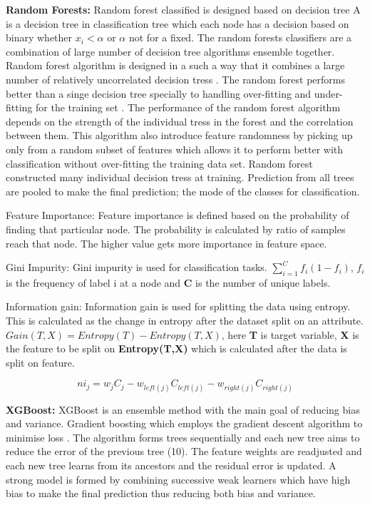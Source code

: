 \begin{outline}
 \1 \textbf{Random Forests:} Random forest classified is designed based on decision tree A is a decision tree in classification tree which each node has a  decision based on binary whether  $x_i < \alpha$ or $\alpha$  not for a fixed. The random forests classifiers are a combination of large number of decision tree  algorithms \cite{breiman2001random} ensemble together. Random forest algorithm is designed in a such a way that it combines a large number of relatively uncorrelated decision tress \cite{breiman2001random}. The random forest performs better than a singe decision tree specially to handling over-fitting and under-fitting for the training set \cite{Mishra2021}. The performance of the random forest algorithm depends on the strength of the individual tress in the forest and the correlation between them. This algorithm also introduce feature randomness by picking up only from a random subset of features which allows it to perform better with classification without over-fitting the training data set. Random forest constructed many individual decision tress at training. Prediction from all trees are pooled to make the final prediction; the mode of the classes for classification.  
 
 \2 Feature Importance: Feature importance is defined based on the probability of finding that particular node. The probability is calculated by ratio of samples reach that node. The higher value gets more importance in feature space. 
 
 \2 Gini Impurity: Gini impurity is used for classification tasks. $\sum_{i=1}^{C} f_i{(1-f_i)}$, \textbf{$f_i$} is the frequency of label i at a node and \textbf{C} is the number of unique labels. 
 
 \2 Information gain: Information gain is used for splitting the data using entropy. This is calculated as the change in entropy after the dataset split on an attribute. $Gain(T,X) = Entropy(T) - Entropy(T,X)$, here \textbf{T} is target variable, \textbf{X} is the feature to be split on \textbf{Entropy(T,X)} which is calculated after the data is split on feature. 
 
 $$ni_j =w_jC_j - w_{left(j)}C_{left(j)} - w_{right(j)}C_{right(j)}$$
 

 
 \1 \textbf{XGBoost:} XGBoost is an ensemble method with the main goal of reducing bias and variance. Gradient boosting which employs the gradient descent algorithm to minimise loss \cite{Chen:2016:XST:2939672.2939785}. The algorithm forms trees sequentially and each new tree aims to reduce the error of the previous tree (10). The feature weights are readjusted and each new tree learns from its ancestors and the residual error is updated. A strong model is formed by combining successive weak learners which have high bias to make the final prediction thus reducing both bias and variance.
\end{outline}




